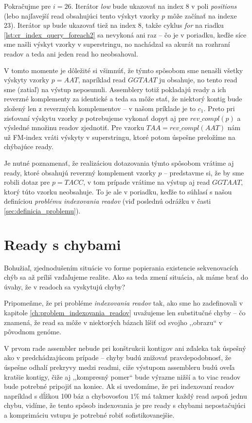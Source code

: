 \begin{example}
Pokračujme pre $i=26$. Iterátor \emph{low} bude ukazovať na index 8 v poli \emph{positions} (lebo najľavejší read obsahujúci tento výskyt vzorky $p$ môže začínať na indexe 23). Iterátor \emph{up} bude ukazovať tiež na index 8, takže cyklus \emph{for} na riadku \ref{lst:cr_index_query_foreach2} sa nevykoná ani raz -- čo je v poriadku, keďže síce sme našli výskyt vzorky v superstringu, no nachádzal sa akurát na rozhraní readov a teda ani jeden read ho neobsahoval.

V tomto momente je dôležité si všimnúť, že týmto spôsobom sme nenašli všetky výskyty vzorky $p=AAT$, napríklad read $GGTAAT$ ju obsahuje, no tento read sme (zatiaľ) na výstup neposunuli. Assemblery totiž pokladajú ready a ich reverzné komplementy za identické a teda sa môže stať, že niektorý kontig bude zložený len z reverzných komplementov -- v našom príklade je to $c_1$. Preto pri zisťovaní výskytu vzorky $p$ potrebujeme vykonať dopyt aj pre $rev\_compl(p)$ a výsledné množinu readov zjednotiť. Pre vzorku $TAA = rev\_compl(AAT)$ nám už FM-index vráti výskyty v superstringu, ktoré potom úspešne preložíme na chýbajúce ready.

Je nutné poznamenať, že realizáciou dotazovania týmto spôsobom vrátime aj ready, ktoré obsahujú reverzný komplement vzorky $p$ -- predstavme si, že by sme robili dotaz pre $p=TACC$, v tom prípade vrátime na výstup aj read $GGTAAT$, ktorý túto vzorku neobsahuje. To je ale v poriadku, keďže to súhlasí s našou definíciou \emph{problému indexovania readov} (viď poslednú odrážku v časti \ref{sec:definicia_problemu}).

\end{example}

\section{Ready s chybami}
\label{sec:ready_s_chybami}
Bohužiaľ, zjednodušením situácie vo forme popierania existencie sekvenovacích chýb sa až príliš vzďaľujeme realite. Ako sa teda zmení situácia, ak máme brať do úvahy, že v readoch sa vyskytujú chyby?

Pripomeňme, že pri probléme \emph{indexovania readov} tak, ako sme ho zadefinovali v kapitole \ref{ch:problem_indexovania_readov} uvažujeme len substitučné chyby -- čo znamená, že read sa môže v niektorých bázach líšiť od svojho ,,obrazu`` v pôvodnom genóme.

V prvom rade assembler nebude pri konštrukcii kontigov ani zďaleka tak úspešný ako v predchádzajúcom prípade -- chyby budú znižovať pravdepodobnosť, že úspešne odhalí prekryvy medzi readmi, ciže výstupom assembleru budú oveľa kratšie kontigy, čiže aj ,,kompresný pomer`` bude výrazne nižší a to viac readov bude potrebné pripojiť na koniec. Ak si uvedomíme, že pri indexovaní readov napríklad s dĺžkou 100 báz a chybovosťou $1\%$ má takmer každý read aspoň jednu chybu, vidíme, že tento spôsob indexovania je pre ready s chybami nepostačujúci a komprimáciu vstupu je potrebné robiť sofistikovanejšie.

